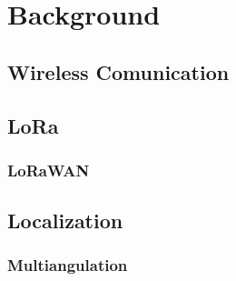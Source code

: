 \chapter{Background}

\section{Wireless Comunication}
\section{LoRa}

\subsection{LoRaWAN}

\section{Localization}

\subsection{Multiangulation}

